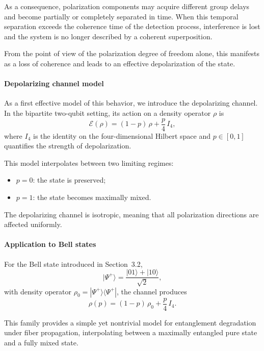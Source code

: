 \documentclass[a4paper]{article}
\begin{document}
As a consequence, polarization components may acquire different group delays and become partially or completely separated in time. When this temporal separation exceeds the coherence time of the detection process, interference is lost and the system is no longer described by a coherent superposition.

\medskip

From the point of view of the polarization degree of freedom alone, this manifests as a loss of coherence and leads to an effective depolarization of the state.

\medskip

\paragraph{Depolarizing channel model}

As a first effective model of this behavior, we introduce the depolarizing channel. In the bipartite two-qubit setting, its action on a density operator \( \rho \) is
\[
\mathcal{E}(\rho)
=
(1 - p)\,\rho
+
\frac{p}{4}\, I_4,
\]
where \( I_4 \) is the identity on the four-dimensional Hilbert space and \( p \in [0,1] \) quantifies the strength of depolarization.

\medskip

This model interpolates between two limiting regimes:
\begin{itemize}
\item \( p = 0 \): the state is preserved;
\item \( p = 1 \): the state becomes maximally mixed.
\end{itemize}

The depolarizing channel is isotropic, meaning that all polarization directions are affected uniformly.

\medskip

\paragraph{Application to Bell states}

For the Bell state introduced in Section~3.2,
\[
|\Psi^+\rangle = \frac{|01\rangle + |10\rangle}{\sqrt{2}},
\]
with density operator \( \rho_0 = |\Psi^+\rangle\langle\Psi^+| \), the channel produces
\[
\rho(p)
=
(1 - p)\,\rho_0
+
\frac{p}{4}\, I_4.
\]

This family provides a simple yet nontrivial model for entanglement degradation under fiber propagation, interpolating between a maximally entangled pure state and a fully mixed state.
\end{document}
